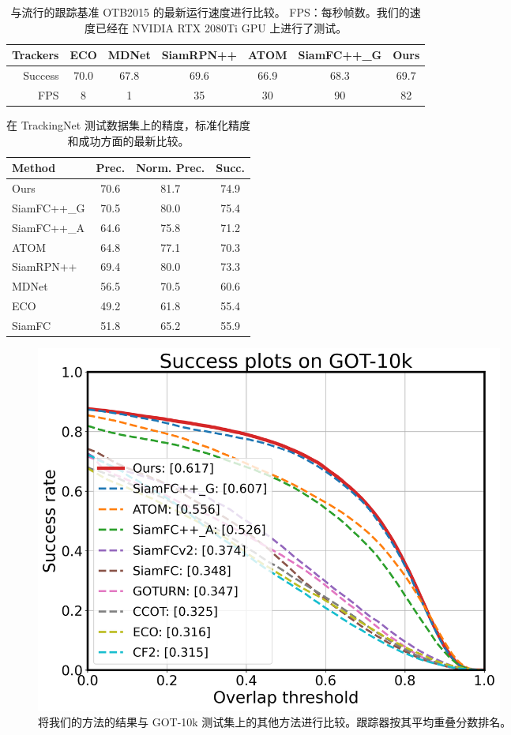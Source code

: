 \begin{table}[t]
\caption{与流行的跟踪基准 OTB2015 的最新运行速度进行比较。 FPS：每秒帧数。我们的速度已经在 NVIDIA RTX 2080Ti GPU 上进行了测试。}
\setlength{\tabcolsep}{3pt}
\begin{center}
\begin{tabular}{r c c c c c c}
\toprule
Trackers & ECO & MDNet & SiamRPN++ & ATOM & SiamFC++\_G & Ours \\
\midrule
Success & 70.0 & 67.8  & 69.6      & 66.9      & 68.3       & 69.7 \\
FPS     & 8    & 1     & 35        & 30       & 90         & 82  \\
\bottomrule
\end{tabular}
\end{center}
\label{table:otb}
\end{table}

\begin{table}[t]
\centering
\caption{在 TrackingNet 测试数据集上的精度，标准化精度和成功方面的最新比较。}
\begin{tabular}{l c c c}
\toprule
Method   &  Prec.   &  Norm. Prec. & Succ.  \\
\midrule
Ours  &  70.6&  81.7 &74.9 \\
SiamFC++\_G& 70.5 & 80.0 & 75.4 \\
SiamFC++\_A  & 64.6 & 75.8 & 71.2 \\
ATOM              & 64.8 & 77.1 & 70.3 \\
SiamRPN++&  69.4 & 80.0 &73.3 \\
MDNet	 &  56.5&  70.5 &60.6 \\
ECO	 &  49.2&  61.8 &55.4 \\
SiamFC	 &  51.8&  65.2 &55.9 \\
\bottomrule
\end{tabular}
\label{tabel:trackingnet}
\end{table}

\begin{figure}[t]
    \centering
    \includegraphics[width=0.75\textwidth]{Img/MTP/got10k/success_plot.png}
    \caption{将我们的方法的结果与 GOT-10k 测试集上的其他方法进行比较。跟踪器按其平均重叠分数排名。}
    \label{fig:got10k}
\end{figure}

